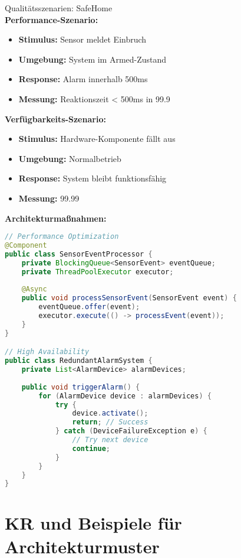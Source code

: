 \begin{example2}{Qualitätsszenarien: SafeHome}\\
\textbf{Performance-Szenario:}
\begin{itemize}
    \item \textbf{Stimulus:} Sensor meldet Einbruch
    \item \textbf{Umgebung:} System im Armed-Zustand
    \item \textbf{Response:} Alarm innerhalb 500ms
    \item \textbf{Messung:} Reaktionszeit < 500ms in 99.9%
\end{itemize}

\textbf{Verfügbarkeits-Szenario:}
\begin{itemize}
    \item \textbf{Stimulus:} Hardware-Komponente fällt aus
    \item \textbf{Umgebung:} Normalbetrieb
    \item \textbf{Response:} System bleibt funktionsfähig
    \item \textbf{Messung:} 99.99%
\end{itemize}

\textbf{Architekturmaßnahmen:}
\begin{lstlisting}[language=Java, style=basesmol]
// Performance Optimization
@Component
public class SensorEventProcessor {
    private BlockingQueue<SensorEvent> eventQueue;
    private ThreadPoolExecutor executor;
    
    @Async
    public void processSensorEvent(SensorEvent event) {
        eventQueue.offer(event);
        executor.execute(() -> processEvent(event));
    }
}

// High Availability
public class RedundantAlarmSystem {
    private List<AlarmDevice> alarmDevices;
    
    public void triggerAlarm() {
        for (AlarmDevice device : alarmDevices) {
            try {
                device.activate();
                return; // Success
            } catch (DeviceFailureException e) {
                // Try next device
                continue;
            }
        }
    }
}
\end{lstlisting}
\end{example2}

\section{KR und Beispiele für Architekturmuster}

